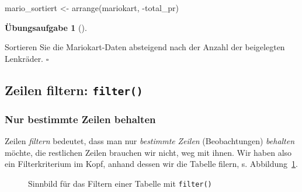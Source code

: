 \documentclass[
  letterpaper,
]{scrbook}
\newenvironment{Shaded}{\begin{snugshade}}{\end{snugshade}}
\newcommand{\FunctionTok}[1]{\textcolor[rgb]{0.28,0.35,0.67}{#1}}
\newcommand{\NormalTok}[1]{\textcolor[rgb]{0.00,0.23,0.31}{#1}}
\newcommand{\OtherTok}[1]{\textcolor[rgb]{0.00,0.23,0.31}{#1}}
\newcommand{\SpecialCharTok}[1]{\textcolor[rgb]{0.37,0.37,0.37}{#1}}
\theoremstyle{definition}
\newtheorem{exercise}{Übungsaufgabe}[chapter]
\theoremstyle{definition}
\theoremstyle{definition}
\theoremstyle{remark}
\begin{document}
\begin{Shaded}
\begin{Highlighting}[]
\NormalTok{mario\_sortiert }\OtherTok{\textless{}{-}} \FunctionTok{arrange}\NormalTok{(mariokart, }\SpecialCharTok{{-}}\NormalTok{total\_pr)}
\end{Highlighting}
\end{Shaded}

\begin{exercise}[]\protect\hypertarget{exr-arrange2}{}\label{exr-arrange2}

Sortieren Sie die Mariokart-Daten absteigend nach der Anzahl der
beigelegten Lenkräder. \(\square\)

\end{exercise}

\subsection{\texorpdfstring{Zeilen filtern:
\texttt{filter()}}{Zeilen filtern: filter()}}\label{zeilen-filtern-filter}

\subsubsection{Nur bestimmte Zeilen
behalten}\label{nur-bestimmte-zeilen-behalten}

Zeilen \emph{filtern} bedeutet, dass man nur \emph{bestimmte}
\emph{Zeilen} (Beobachtungen) \emph{behalten} möchte, die restlichen
Zeilen brauchen wir nicht, weg mit ihnen. Wir haben also ein
Filterkriterium im Kopf, anhand dessen wir die Tabelle filern, s.
Abbildung~\ref{fig-filter}.

\begin{figure}


\caption{\label{fig-filter}Sinnbild für das Filtern einer Tabelle mit
\texttt{filter()}}

\end{figure}%
\end{document}
